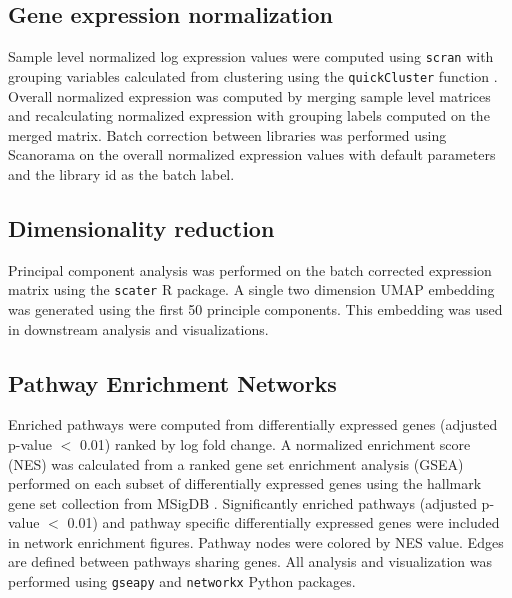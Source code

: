 \subsection{Gene expression normalization}

Sample level normalized log expression values were computed using \texttt{scran} \cite{lun2016pooling} with grouping variables calculated from clustering using the \texttt{quickCluster} function \cite{lun2016step}. Overall normalized expression was computed by merging sample level matrices and recalculating normalized expression with grouping labels computed on the merged matrix. Batch correction between libraries was performed using Scanorama \cite{hie2019efficient} on the overall normalized expression values with default parameters and the library id as the batch label.

\subsection{Dimensionality reduction}

Principal component analysis was performed on the batch corrected expression matrix using the \texttt{scater} \cite{mccarthy2017scater} R package.  A single two dimension UMAP \cite{becht2019dimensionality} embedding was generated using the first 50 principle components. This embedding was used in downstream analysis and visualizations.

\subsection{Pathway Enrichment Networks}

Enriched pathways were computed from differentially expressed genes (adjusted p-value $<$ 0.01) ranked by log fold change.  A normalized enrichment score (NES) was calculated from a ranked gene set enrichment analysis (GSEA) \cite{shi2007gene} performed on each subset of differentially expressed genes using the hallmark gene set collection from MSigDB \cite{liberzon2015molecular}.  Significantly enriched pathways (adjusted p-value $<$ 0.01) and pathway specific differentially expressed genes were included in network enrichment figures.  
Pathway nodes were colored by NES value. Edges are defined between pathways sharing genes.
All analysis and visualization was performed using \texttt{gseapy} and \texttt{networkx} \cite{hagberg2008exploring} Python packages.

